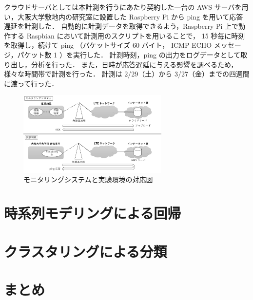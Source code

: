 \documentclass[technicalreport]{ieicej}
\begin{document}
クラウドサーバとしては本計測を行うにあたり契約した一台の AWS サーバを用い，大阪大学敷地内の研究室に設置した Raspberry Pi から ping を用いて応答遅延を計測した．
自動的に計測データを取得できるよう，Raspberry Pi 上で動作する Raspbian において計測用のスクリプトを用いることで， 15 秒毎に時刻を取得し，続けて ping （パケットサイズ 60 バイト， ICMP ECHO メッセージ，パケット数 1 ）を実行した．
計測時刻，ping の出力をログデータとして取り出し，分析を行った．
また，日時が応答遅延に与える影響を調べるため，様々な時間帯で計測を行った．
計測は 2/29（土）から 3/27（金）までの四週間に渡って行った．

\begin{figure}[tb]
\centering
\includegraphics[width=7.5cm]{experiment.pdf}
\caption{モニタリングシステムと実験環境の対応図}
\label{exp}
\end{figure}

\section{時系列モデリングによる回帰}

\section{クラスタリングによる分類}

\section{まとめ}



\end{document}
